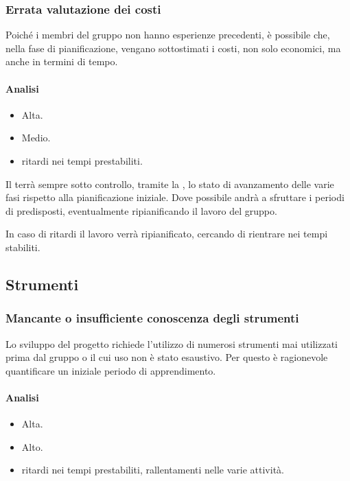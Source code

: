 \documentclass[a4paper, titlepage]{article}
\begin{document}
	
	\subsubsection{Errata valutazione dei costi}
	Poiché i membri del gruppo non hanno esperienze precedenti, è possibile che, nella fase di pianificazione, vengano sottostimati i costi, non solo economici, ma anche in termini di tempo.
	
	\paragraph {Analisi}
	\begin{itemize}
		\item {} Alta.
		\item {} Medio.
		\item {} ritardi nei tempi prestabiliti.
	\end{itemize}
	
	Il  terrà sempre sotto controllo, tramite la , lo stato di avanzamento delle varie fasi rispetto alla pianificazione iniziale. Dove possibile andrà a sfruttare i periodi di  predisposti, eventualmente ripianificando il lavoro del gruppo.
	
	In caso di ritardi il lavoro verrà ripianificato, cercando di rientrare nei tempi stabiliti.
	
	\subsection{Strumenti}
	\subsubsection{Mancante o insufficiente conoscenza degli strumenti}
	Lo sviluppo del progetto richiede l'utilizzo di numerosi strumenti mai utilizzati prima dal gruppo o il cui uso non è stato esaustivo. Per questo è ragionevole quantificare un iniziale periodo di apprendimento.
	
	\paragraph{Analisi}
	\begin{itemize}
		\item {} Alta.
		\item {} Alto.
		\item {} ritardi nei tempi prestabiliti, rallentamenti nelle varie attività.
	\end{itemize}
	
\end{document}
